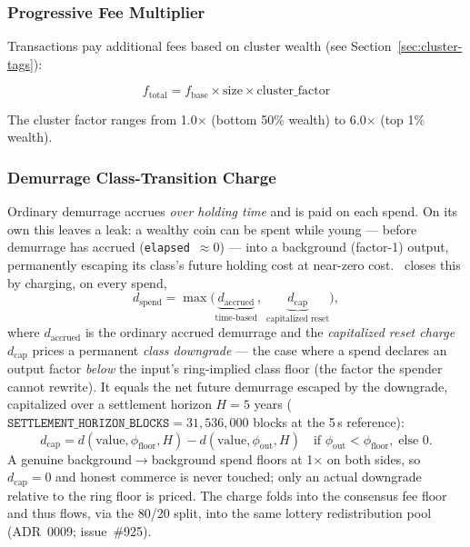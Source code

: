 \subsubsection{Progressive Fee Multiplier}

Transactions pay additional fees based on cluster wealth (see
Section~\ref{sec:cluster-tags}):

\begin{equation}
f_{\text{total}} = f_{\text{base}} \times \text{size} \times \text{cluster\_factor}
\end{equation}

The cluster factor ranges from 1.0$\times$ (bottom 50\% wealth) to
6.0$\times$ (top 1\% wealth).

\subsubsection{Demurrage Class-Transition Charge}
\label{sec:demurrage-class-transition}

Ordinary demurrage accrues \emph{over holding time} and is paid on each spend.
On its own this leaves a leak: a wealthy coin can be spent while young ---
before demurrage has accrued (\texttt{elapsed}~$\approx 0$) --- into a
background (factor-1) output, permanently escaping its class's future holding
cost at near-zero cost. \Botho\ closes this by charging, on every spend,
\begin{equation}
d_{\text{spend}} = \max\!\big(\underbrace{d_{\text{accrued}}}_{\text{time-based}},\;
\underbrace{d_{\text{cap}}}_{\text{capitalized reset}}\big),
\end{equation}
where $d_{\text{accrued}}$ is the ordinary accrued demurrage and the
\emph{capitalized reset charge} $d_{\text{cap}}$ prices a permanent
\emph{class downgrade} --- the case where a spend declares an output factor
\emph{below} the input's ring-implied class floor (the factor the spender
cannot rewrite). It equals the net future demurrage escaped by the downgrade,
capitalized over a settlement horizon $H = 5$ years
($\texttt{SETTLEMENT\_HORIZON\_BLOCKS} = 31{,}536{,}000$ blocks at the 5\,s
reference):
\begin{equation}
d_{\text{cap}} = d(\text{value}, \phi_{\text{floor}}, H) - d(\text{value}, \phi_{\text{out}}, H)
\quad\text{if } \phi_{\text{out}} < \phi_{\text{floor}},\; \text{else } 0.
\end{equation}
A genuine background$\to$background spend floors at 1$\times$ on both sides, so
$d_{\text{cap}} = 0$ and honest commerce is never touched; only an actual
downgrade relative to the ring floor is priced. The charge folds into the
consensus fee floor and thus flows, via the 80/20 split, into the same
lottery redistribution pool (ADR~0009; issue~\#925).

